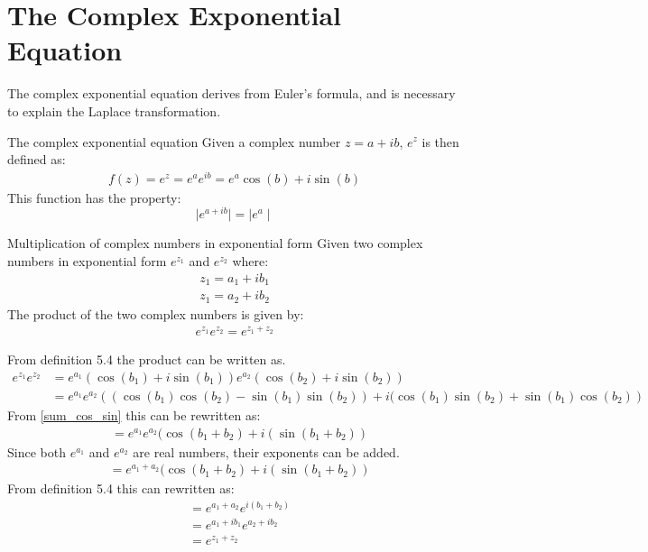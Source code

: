 \section{The Complex Exponential Equation}
The complex exponential equation derives from Euler’s formula, and is necessary to explain the Laplace transformation. \\

\begin{definition}{The complex exponential equation}{}
Given a complex number $z=a+ib$, $e^{z}$ is then defined as:
\begin{align*}
f(z)=e^z=e^ae^{ib}=e^a\cos(b)+i\sin(b)
\end{align*}
This function has the property:
$$\mid e^{a+ib} \mid = \mid e^a \mid$$
\end{definition}
\begin{theorem}{Multiplication of complex numbers in exponential form}{}
Given two complex numbers in exponential form $e^{z_1}$ and $e^{z_2}$ where:
\begin{align*}
z_1=a_1+ib_1
\\
z_1=a_2+ib_2
\end{align*}
The product of the two complex numbers is given by:
\begin{align}
e^{z_1}e^{z_2}=e^{z_1+z_2}
\end{align}
\end{theorem}
\begin{prof}{}{}
From definition 5.4 %
the product can be written as.
\begin{align*}
e^{z_1}e^{z_2}&=e^{a_1}(\cos(b_1)+i\sin(b_1))e^{a_2}(\cos(b_2)+i\sin(b_2))
\\
&=e^{a_1}e^{a_2}\left( (\cos(b_1)\cos(b_2)-\sin(b_1) \sin(b_2))+i(\cos(b_1)\sin(b_2)+\sin(b_1)\cos(b_2)\right)
\end{align*}
From \eqref{sum_cos_sin} this can be rewritten as:
\begin{align*}
&=e^{a_1}e^{a_2}(\cos(b_1+b_2)+i(\sin(b_1+b_2))
\end{align*}
Since both $e^{a_1}$ and $e^{a_2}$ are real numbers, their exponents can be added.
\begin{align*}
&=e^{a_1+a_2}(\cos(b_1+b_2)+i(\sin(b_1+b_2))
\end{align*}
From definition 5.4 %
this can rewritten as:
\begin{align*}
&=e^{a_1+a_2}e^{i(b_1+b_2)}
\\
&=e^{a_1+ib_1}e^{a_2+ib_2}
\\
&=e^{z_1+z_2}
\end{align*} 
\end{prof}
